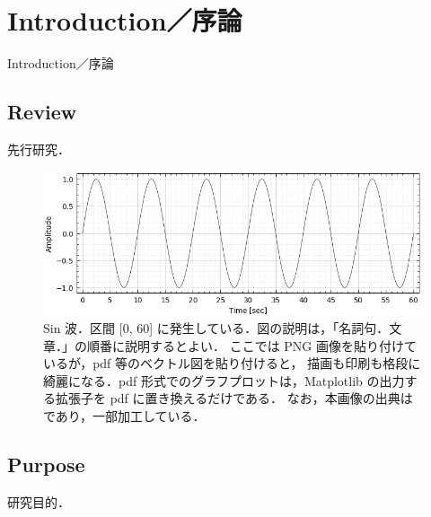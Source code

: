 \chapter{Introduction／序論}
\label{chap_Introduction}

Introduction／序論

\section{Review}
先行研究．

\begin{figure} %
  \centering
  \includegraphics[width=15cm]{./figs/sin.png}
  \caption{
    Sin 波．区間 [0, 60] に発生している．図の説明は，「名詞句．文章．」の順番に説明するとよい．
    ここでは PNG 画像を貼り付けているが，pdf 等のベクトル図を貼り付けると，
    描画も印刷も格段に綺麗になる．pdf 形式でのグラフプロットは，Matplotlib の出力する拡張子を pdf に置き換えるだけである．
    なお，本画像の出典は \citep{ADMIS2018} であり，一部加工している．
  }
  \label{fig_ADMIS2018}
\end{figure}

\section{Purpose}
研究目的．

